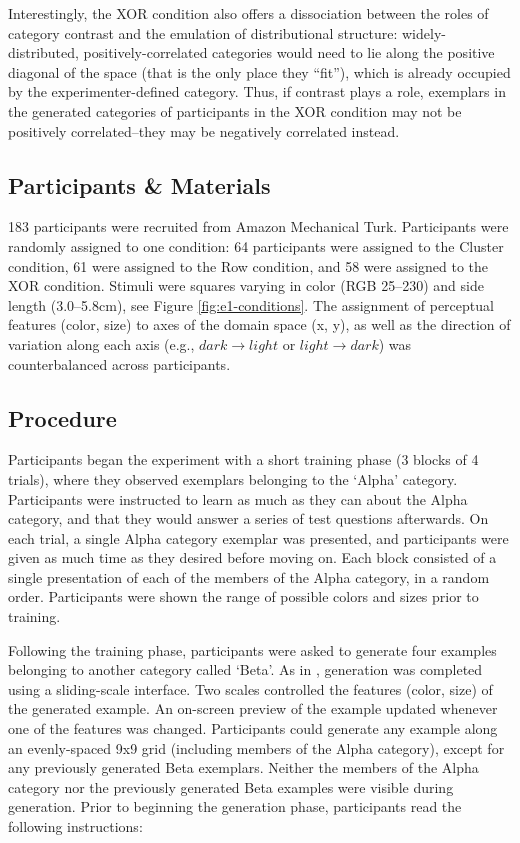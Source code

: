 \documentclass[12pt]{article}
\begin{document}
\begin{flushleft}
Interestingly, the XOR condition also offers a dissociation between the roles of category contrast and the emulation of distributional structure: widely-distributed, positively-correlated categories would need to lie along the positive diagonal of the space (that is the only place they ``fit''), which is already occupied by the experimenter-defined category. Thus, if contrast plays a role, exemplars in the generated categories of participants in the XOR condition may not be positively correlated--they may be negatively correlated instead.


\subsection{Participants \& Materials}

183 participants were recruited from Amazon Mechanical Turk. Participants were randomly assigned to one condition: 64 participants were assigned to the Cluster condition, 61 were assigned to the Row condition, and 58 were assigned to the XOR condition. Stimuli were squares varying in color (RGB 25--230) and side length (3.0--5.8cm), see Figure \ref{fig:e1-conditions}. The assignment of perceptual features (color, size) to axes of the domain space (x, y), as well as the direction of variation along each axis (e.g., $dark \rightarrow light$ or $light \rightarrow dark$) was counterbalanced across participants.


\subsection{Procedure}

Participants began the experiment with a short training phase (3 blocks of 4 trials), where they observed exemplars belonging to the `Alpha' category. Participants were instructed to learn as much as they can about the Alpha category, and that they would answer a series of test questions afterwards. On each trial, a single Alpha category exemplar was presented, and participants were given as much time as they desired before moving on. Each block consisted of a single presentation of each of the members of the Alpha category, in a random order. Participants were shown the range of possible colors and sizes prior to training.

Following the training phase, participants were asked to generate four examples belonging to another category called `Beta'. As in \citet{jern2013probabilistic}, generation was completed using a sliding-scale interface. Two scales controlled the features (color, size) of the generated example. An on-screen preview of the example updated whenever one of the features was changed. Participants could generate any example along an evenly-spaced 9x9 grid (including members of the Alpha category), except for any previously generated Beta exemplars. Neither the members of the Alpha category nor the previously generated Beta examples were visible during generation. Prior to beginning the generation phase, participants read the following instructions:


\end{flushleft}
\end{document}

